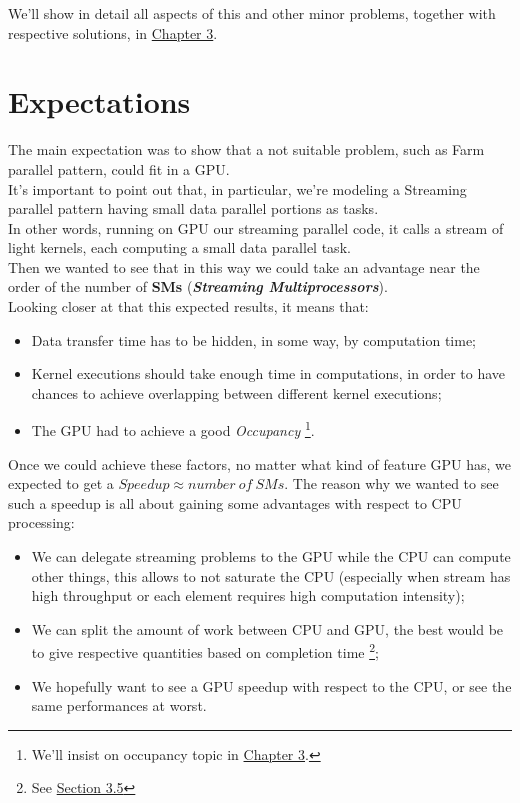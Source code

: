 	
	We'll show in detail all aspects of this and other minor problems, together with respective solutions, in \hyperref[chap:logic]{Chapter 3}.

\section{Expectations}
	The main expectation was to show that a not suitable problem, such as Farm parallel pattern, could fit in a GPU.\\
	It's important to point out that, in particular, we're modeling a Streaming parallel pattern having small data parallel portions as tasks.\\
	In other words, running on GPU our streaming parallel code, it calls a stream of light kernels, each computing a small data parallel task.\\
	Then we wanted to see that in this way we could take an advantage near the order of the number of \textbf{SMs} (\textit{\textbf{Streaming Multiprocessors}}).\\

	Looking closer at that this expected results, it means that:
	\begin{itemize}
		\item Data transfer time has to be hidden, in some way, by computation time;
		
		\item Kernel executions should take enough time in computations, in order to have chances to achieve overlapping between different kernel executions;
		
		\item The GPU had to achieve a good \textit{Occupancy} \footnote{We'll insist on occupancy topic in \hyperref[chap:logic]{Chapter 3}.}.\\
	\end{itemize}
	Once we could achieve these factors, no matter what kind of feature GPU has, we expected to get a \(Speedup \approx number \: of \: SMs \).
	The reason why we wanted to see such a speedup is all about gaining some advantages with respect to CPU processing:
	\begin{itemize}
		\item We can delegate streaming problems to the GPU while the CPU can compute other things, this allows to not saturate the CPU (especially when stream has high throughput or each element requires high computation intensity); 
		
		\item We can split the amount of work between CPU and GPU, the best would be to give respective quantities based on completion time \footnote{See \hyperref[sect:cpugpuscheduling]{Section 3.5}};
	 
		
		\item We hopefully want to see a GPU speedup with respect to the CPU, or see the same performances at worst.
	\end{itemize}

